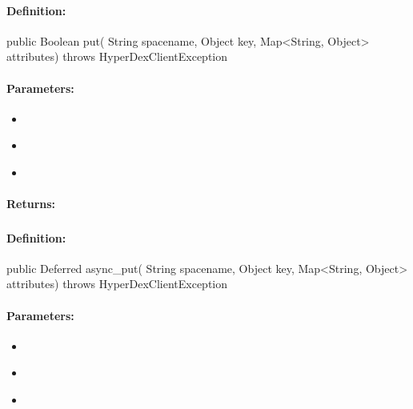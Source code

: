 \paragraph{Definition:}
\begin{javacode}
public Boolean put(
        String spacename,
        Object key,
        Map<String, Object> attributes) throws HyperDexClientException
\end{javacode}

\paragraph{Parameters:}
\begin{itemize}[noitemsep]
\item {}\\

\item {}\\

\item {}\\

\end{itemize}

\paragraph{Returns:}


\pagebreak
\subsubsection{}
\label{api:java:async_put}


\paragraph{Definition:}
\begin{javacode}
public Deferred async_put(
        String spacename,
        Object key,
        Map<String, Object> attributes) throws HyperDexClientException
\end{javacode}

\paragraph{Parameters:}
\begin{itemize}[noitemsep]
\item {}\\

\item {}\\

\item {}\\

\end{itemize}

